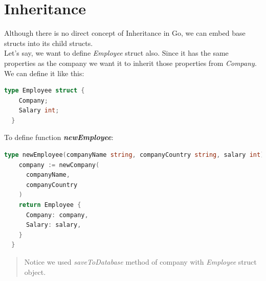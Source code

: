 \documentclass[12pt,a4paper]{report}
\begin{document}
\section*{Inheritance}
Although there is no direct concept of Inheritance in Go, we can embed base
structs into its child structs.\\
Let's say, we want to define \textit{Employee} struct also. Since it has the same
properties as the company we want it to inherit those properties from 
\textit{Company}. We can define it like this:
\begin{lstlisting}[language=Go]
  type Employee struct {
    Company;
    Salary int;
  }
\end{lstlisting}
To define function \textit{\textbf{newEmployee}}:
\begin{lstlisting}[language=Go]
  type newEmployee(companyName string, companyCountry string, salary int) Employee {
    company := newCompany(
      companyName,
      companyCountry
    )
    return Employee {
      Company: company,
      Salary: salary,
    }
  }
\end{lstlisting}
\begin{quote}
  Notice we used \textit{saveToDatabase} method of company with \textit{Employee} struct\\
  object.
\end{quote}
\end{document}
